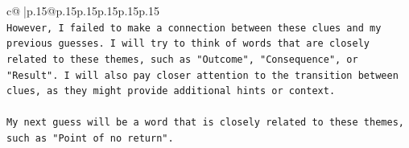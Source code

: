 \documentclass{article}
\begin{document}
{\begin{supertabular}{c@{$\;$}|p{.15\linewidth}@{}p{.15\linewidth}p{.15\linewidth}p{.15\linewidth}p{.15\linewidth}p{.15\linewidth}}
{{{\\ 
\texttt{However, I failed to make a connection between these clues and my previous guesses. I will try to think of words that are closely related to these themes, such as "Outcome", "Consequence", or "Result". I will also pay closer attention to the transition between clues, as they might provide additional hints or context. } \\
\\ 
\texttt{My next guess will be a word that is closely related to these themes, such as "Point of no return".} \\
            }
        }
    }
     \\ \\

\end{supertabular}
}
\end{document}
